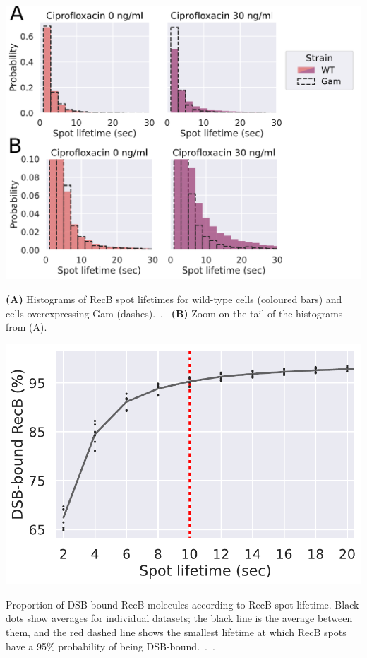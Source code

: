 \begin{suppfigure*}[htbp]
    \begin{center}
    \includegraphics[width=0.75\linewidth]{SI_Figures/Gam_lifetimes_vs_WT.pdf}
    \end{center}
    \caption{\textbf{(A)} Histograms of RecB spot lifetimes for wild-type cells (coloured bars) and cells overexpressing Gam (dashes).\ .\  \textbf{(B)} Zoom on the tail of the histograms from (A).}\label{SIFig:Gam_RecB_lifetimes_vs_WT}
\end{suppfigure*}

\begin{suppfigure*}[htbp]
    \begin{center}
        \includegraphics[width=.4\textwidth]{SI_Figures/Proba_DSB_bound.pdf}
    \end{center}
    \caption{Proportion of DSB-bound RecB molecules according to RecB spot lifetime. Black dots show averages for individual datasets; the black line is the average between them, and the red dashed line shows the smallest lifetime at which RecB spots have a 95\% probability of being DSB-bound.\ .\ .}\label{SIFig:proba_DSB_bound}
\end{suppfigure*}

